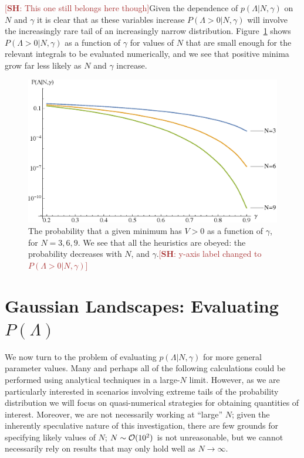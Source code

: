 \documentclass[12pt]{article}
\newcommand{\SH}[1]{\textcolor{brown}{[{\bf SH}: #1]}}
\begin{document}
 
\SH{This one still belongs here though}Given the dependence of $p(\Lambda|N,\gamma)$ on $N$ and $\gamma$ it is clear that as these variables increase $P(\Lambda>0|N,\gamma)$ will involve the increasingly rare tail of an increasingly narrow distribution. Figure~\ref{N6} shows $P(\Lambda>0|N,\gamma)$ as a function of $\gamma$ for values of $N$ that are small enough for the relevant integrals to be evaluated numerically, and we see that positive minima grow far less likely as $N$ and $\gamma$ increase. 



\begin{figure}
  \centering
  \includegraphics[width=.6 \linewidth]{N369.eps}
  \caption{The probability that a given minimum has $V > 0$ as a function of $\gamma$, for $N=3, 6, 9$. We see that all the heuristics are obeyed: the probability decreases with $N$, and  $\gamma$.\SH{y-axis label changed to $P(\Lambda>0|N,\gamma)$}}
  \label{N6}
  \end{figure}


\section{Gaussian Landscapes: Evaluating $P(\Lambda)$} \label{PeakNumbers}

We now turn to the problem of evaluating $p(\Lambda|N,\gamma)$  for more general parameter values. Many and perhaps all of the following calculations could be performed using analytical techniques in a large-$N$ limit. However,  as we are particularly interested in scenarios involving extreme tails of  the probability distribution we will focus on quasi-numerical strategies for obtaining quantities of interest. Moreover, we are  not necessarily working at ``large'' $N$; given the inherently speculative nature of this investigation, there are few  grounds for specifying likely values of $N$;  $N\sim{\cal O}(10^2)$ is not unreasonable, but we cannot necessarily rely on results that may only hold well as $N\rightarrow \infty$. 
\end{document}
